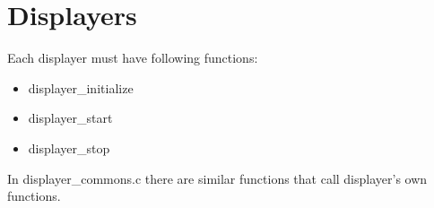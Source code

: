 \part{Displayers}

Each displayer must have following functions:
\begin{itemize}
\item{displayer\_initialize}
\item{displayer\_start}
\item{displayer\_stop}
\end{itemize}

In displayer\_commons.c there are similar functions
that call displayer's own functions.


